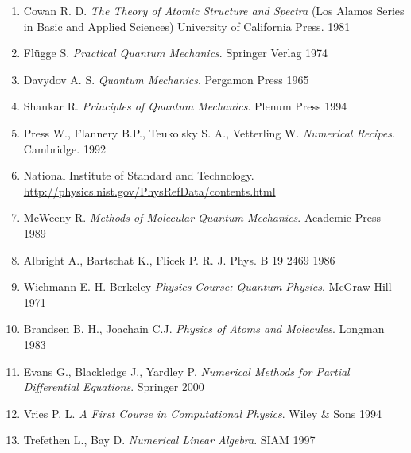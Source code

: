 \documentclass{article}
\begin{document}
\begin{enumerate}
\item Cowan R. D. \textit{The Theory of Atomic Structure and Spectra} (Los Alamos Series in Basic and Applied Sciences) University of California Press. 1981

\item Flügge S. \textit{Practical Quantum Mechanics}. Springer Verlag 1974

\item Davydov A. S. \textit{Quantum Mechanics}. Pergamon Press 1965

\item Shankar R. \textit{Principles of Quantum Mechanics}. Plenum Press 1994

\item Press W., Flannery B.P., Teukolsky S. A., Vetterling W. \textit{Numerical Recipes}. Cambridge. 1992

\item National Institute of Standard and Technology. \url{http://physics.nist.gov/PhysRefData/contents.html}

\item McWeeny R. \textit{Methods of Molecular Quantum Mechanics}. Academic Press 1989

\item Albright A., Bartschat K., Flicek P. R. J. Phys. B 19 2469 1986

\item Wichmann E. H. Berkeley \textit{Physics Course: Quantum Physics}. McGraw-Hill 1971

\item Brandsen B. H., Joachain C.J. \textit{Physics of Atoms and Molecules}. Longman 1983

\item Evans G., Blackledge J., Yardley P. \textit{Numerical Methods for Partial Differential Equations}. Springer 2000

\item Vries P. L. \textit{A First Course in Computational Physics}. Wiley \& Sons 1994

\item Trefethen L., Bay D. \textit{Numerical Linear Algebra}. SIAM 1997
\end{enumerate}
\end{document}
